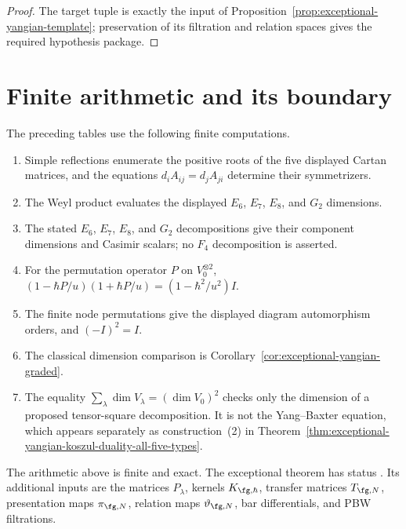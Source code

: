 \begin{proof}
The target tuple is exactly the input of
Proposition~\ref{prop:exceptional-yangian-template}; preservation of its
filtration and relation spaces gives the required hypothesis package.
\end{proof}

\section{Finite arithmetic and its boundary}
\label{sec:exceptional-yangian-verification}

The preceding tables use the following finite computations.
\begin{enumerate}[label=\textup{(\alph*)}]
\item Simple reflections enumerate the positive roots of the five
displayed Cartan matrices, and the equations
$d_iA_{ij}=d_jA_{ji}$ determine their symmetrizers.
\item The Weyl product evaluates the displayed $E_6$, $E_7$, $E_8$,
and $G_2$ dimensions.
\item The stated $E_6$, $E_7$, $E_8$, and $G_2$ decompositions give
their component dimensions and Casimir scalars; no $F_4$
decomposition is asserted.
\item For the permutation operator $P$ on $V_0^{\otimes2}$,
$(1-\hbar P/u)(1+\hbar P/u)=(1-\hbar^2/u^2)I$.
\item The finite node permutations give the displayed diagram
automorphism orders, and $(-I)^2=I$.
\item The classical dimension comparison is
Corollary~\ref{cor:exceptional-yangian-graded}.
\item The equality
$\sum_\lambda\dim V_\lambda=(\dim V_0)^2$ checks only the dimension
of a proposed tensor-square decomposition.  It is not the
Yang--Baxter equation, which appears separately as construction~\textup{(2)} in
Theorem~\ref{thm:exceptional-yangian-koszul-duality-all-five-types}.
\end{enumerate}

\begin{remark}
\label{rem:exceptional-yangian-hziv}
The arithmetic above is finite and exact.  The exceptional theorem has
status \ClaimStatusConditional.  Its additional inputs are the matrices
$P_\lambda$, kernels $K_{\fg,\hbar}$, transfer matrices $T_{\fg,N}$,
presentation maps $\pi_{\fg,N}$, relation maps $\vartheta_{\fg,N}$,
bar differentials, and PBW filtrations.
\end{remark}

